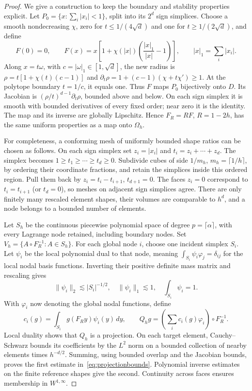 \documentclass[11pt]{article}
\theoremstyle{remark}
\newcommand{\norm}[1]{\lVert #1\rVert}
\newcommand{\abs}[1]{\lvert #1\rvert}
\begin{document}
\begin{proof}
We give a construction to keep the boundary and stability properties explicit. Let
$P_0=\{x:\sum_i\abs{x_i}<1\}$, split into its $2^d$ sign simplices. Choose a smooth nondecreasing $\chi$, zero for $t\le1/(4\sqrt d)$ and one for $t\ge1/(2\sqrt d)$, and define
\[
 F(0)=0,\qquad
 F(x)=x\left[1+\chi(\abs{x})\left(\frac{\abs{x}_1}{\abs{x}}-1\right)\right],
 \qquad \abs{x}_1=\sum_i\abs{x_i}.
\]
Along $x=t\omega$, with $c=\abs{\omega}_1\in[1,\sqrt d]$, the new radius is
$\rho=t[1+\chi(t)(c-1)]$ and
$\partial_t\rho=1+(c-1)(\chi+t\chi')\ge1$.
At the polytope boundary $t=1/c$, it equals one. Thus $F$ maps $P_0$ bijectively onto $D$. Its Jacobian is $(\rho/t)^{d-1}\partial_t\rho$, bounded above and below. On each sign simplex it is smooth with bounded derivatives of every fixed order; near zero it is the identity. The map and its inverse are globally Lipschitz. Hence $F_R=RF$, $R=1-2h$, has the same uniform properties as a map onto $\Omega_h$.

For completeness, a conforming mesh of uniformly bounded shape ratios can be chosen as follows. On each sign simplex set $z_i=\abs{x_i}$ and $t_i=z_i+\cdots+z_d$. The simplex becomes $1\ge t_1\ge\cdots\ge t_d\ge0$. Subdivide cubes of side $1/m_h$, $m_h=\lceil1/h\rceil$, by ordering their coordinate fractions, and retain the simplices inside this ordered region. Pull them back by $z_i=t_i-t_{i+1}$, $t_{d+1}=0$. The faces $z_i=0$ correspond to $t_i=t_{i+1}$ (or $t_d=0$), so meshes on adjacent sign simplices agree. There are only finitely many rescaled element shapes, their volumes are comparable to $h^d$, and a node belongs to a bounded number of elements.

Let $S_h$ be the continuous piecewise polynomial space of degree $p=\lceil\alpha\rceil$, with every Lagrange node retained, including boundary nodes. Set
$V_h=\{A\circ F_R^{-1}:A\in S_h\}$.
For each global node $i$, choose one incident simplex $S_i$. Let $\psi_i$ be the local polynomial dual to that node, meaning
$\int_{S_i}\psi_i\varphi_j=\delta_{ij}$ for the local nodal basis functions. Inverting their positive definite mass matrix and rescaling gives
\[
 \norm{\psi_i}_2\lesssim\abs{S_i}^{-1/2},\quad
 \norm{\psi_i}_1\lesssim1,\quad \int_{S_i}\psi_i=1.
\]
With $\varphi_i$ now denoting the global nodal functions, define
\[
 c_i(g)=\int_{S_i}g(F_Ry)\psi_i(y)\,dy,
 \qquad Q_hg=\left(\sum_i c_i(g)\varphi_i\right)\circ F_R^{-1}.
\]
Local duality shows that $Q_h$ is a projection. On each target element, Cauchy--Schwarz bounds its coefficients by the $L^2$ norm on a bounded collection of nearby elements times $h^{-d/2}$. Summing, using bounded overlap and the Jacobian bounds, proves the first estimate in~\eqref{eq:projectionbounds}. Polynomial inverse estimates on the finite reference shapes give the second. Continuity across faces ensures membership in $W^{1,\infty}$.


\end{proof}
\end{document}
